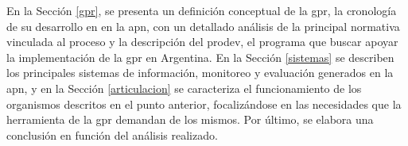 En la Sección \ref{gpr}, se presenta un definición conceptual de la \ac{gpr},  la cronología de su desarrollo en en la \ac{apn}, con un detallado análisis de la principal normativa vinculada al proceso y la descripción del \ac{prodev}, el programa que buscar apoyar la implementación de la \ac{gpr} en Argentina. En la Sección \ref{sistemas} se describen los principales sistemas de información, monitoreo y evaluación generados en la \ac{apn}, y en la Sección \ref{articulacion} se caracteriza el funcionamiento de los organismos descritos en el punto anterior, focalizándose en las necesidades que la herramienta de la \ac{gpr} demandan de los mismos. Por último, se elabora una conclusión en función del análisis realizado.